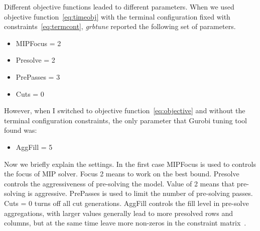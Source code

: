 Different objective functions leaded to different parameters. When we used
objective function~\eqref{eq:timeobj} with the terminal configuration fixed
with constraints~\eqref{eq:termcont}, \textit{grbtune} reported the following
set of parameters.
\begin{itemize}
    \item MIPFocus = 2
    \item Presolve = 2
    \item PrePasses = 3
    \item Cuts = 0
\end{itemize}

However, when I switched to objective function~\eqref{eq:objective} and
without the terminal configuration constraints, the only parameter that Gurobi
tuning tool found was:
\begin{itemize}
    \item AggFill = 5
\end{itemize}

Now we briefly explain the settings. In the first case MIPFocus is used to
controls the focus of MIP solver. Focus 2 means to work on the best bound.
Presolve controls the aggressiveness of pre-solving the model. Value of 2 means
that pre-solving is aggressive. PrePasses is used to limit the number of
pre-solving passes. Cuts = 0 turns off all cut generations. AggFill controls
the fill level in pre-solve aggregations, with larger values generally lead to
more presolved rows and columns, but at the same time leave more non-zeros in
the constraint matrix~\cite{gurobiparams}.
